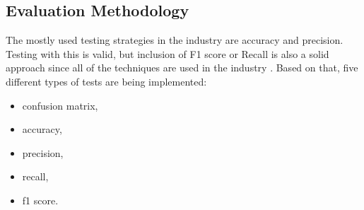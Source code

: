 \subsection{Evaluation Methodology}
The mostly used testing strategies in the industry are accuracy and precision. Testing with this is valid, but inclusion of F1 score or Recall is also a solid approach since all of the techniques are used in the industry \parencite{web:testingDL}.
Based on that, five different types of tests are being implemented:
\begin{itemize}
  \item confusion matrix,
  \item accuracy,
  \item precision,
  \item recall,
  \item f1 score.
\end{itemize}















